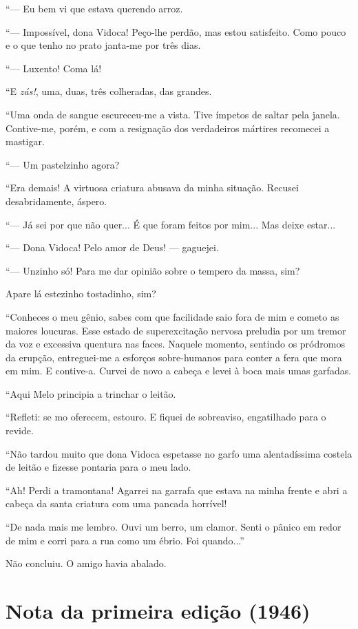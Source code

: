 ``--- Eu bem vi que estava querendo arroz.

``--- Impossível, dona Vidoca! Peço-lhe perdão, mas estou satisfeito.
Como pouco e o que tenho no prato janta-me por três dias.

``--- Luxento! Coma lá!

``E \emph{zás!}, uma, duas, três colheradas, das grandes.

``Uma onda de sangue escureceu-me a vista. Tive ímpetos de saltar pela
janela. Contive-me, porém, e com a resignação dos verdadeiros mártires
recomecei a mastigar.

``--- Um pastelzinho agora?

``Era demais! A virtuosa criatura abusava da minha situação. Recusei
desabridamente, áspero.

``--- Já sei por que não quer... É que foram feitos por mim... Mas deixe
estar...

``--- Dona Vidoca! Pelo amor de Deus! --- gaguejei.

``--- Unzinho só! Para me dar opinião sobre o tempero da massa, sim?

Apare lá estezinho tostadinho, sim?

``Conheces o meu gênio, sabes com que facilidade saio fora de mim e
cometo as maiores loucuras. Esse estado de superexcitação nervosa
preludia por um tremor da voz e excessiva quentura nas faces. Naquele
momento, sentindo os pródromos da erupção, entreguei-me a esforços
sobre-humanos para conter a fera que mora em mim. E contive-a. Curvei de
novo a cabeça e levei à boca mais umas garfadas.

``Aqui Melo principia a trinchar o leitão.

``Refleti: se mo oferecem, estouro. E fiquei de sobreaviso, engatilhado
para o revide.

``Não tardou muito que dona Vidoca espetasse no garfo uma alentadíssima
costela de leitão e fizesse pontaria para o meu lado.

``Ah! Perdi a tramontana! Agarrei na garrafa que estava na minha frente
e abri a cabeça da santa criatura com uma pancada horrível!

``De nada mais me lembro. Ouvi um berro, um clamor. Senti o pânico em
redor de mim e corri para a rua como um ébrio. Foi quando...''

Não concluiu. O amigo havia abalado.

\section{Nota da primeira edição (1946)}

